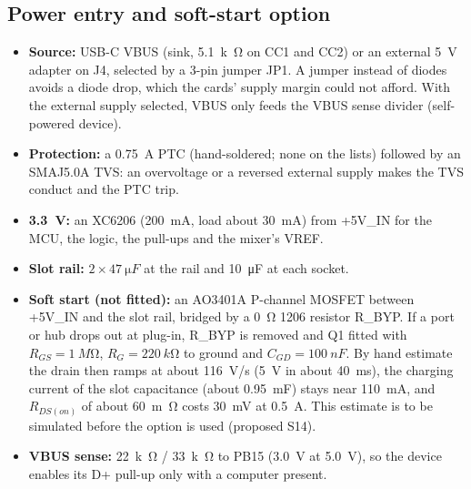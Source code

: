\documentclass[11pt,a4paper]{article}
\begin{document}
\subsection{Power entry and soft-start option}\label{sec:bppower}
\begin{itemize}
  \item \textbf{Source:} USB-C VBUS (sink, \SI{5.1}{k\ohm} on CC1 and CC2) or an external \SI{5}{V} adapter on J4,
    selected by a 3-pin jumper JP1. A jumper instead of diodes avoids a diode drop, which the cards' supply margin
    could not afford. With the external supply selected, VBUS only feeds the VBUS sense divider (self-powered device).
  \item \textbf{Protection:} a \SI{0.75}{A} PTC (hand-soldered; none on the lists) followed by an SMAJ5.0A TVS: an
    overvoltage or a reversed external supply makes the TVS conduct and the PTC trip.
  \item \textbf{\SI{3.3}{V}:} an XC6206 (\SI{200}{mA}, load about \SI{30}{mA}) from +5V\_IN for the MCU, the logic, the
    pull-ups and the mixer's VREF.
  \item \textbf{Slot rail:} $2\times\SI{47}{\micro F}$ at the rail and \SI{10}{\micro F} at each socket.
  \item \textbf{Soft start (not fitted):} an AO3401A P-channel MOSFET between +5V\_IN and the slot rail, bridged by a
    \SI{0}{\ohm} 1206 resistor R\_BYP. If a port or hub drops out at plug-in, R\_BYP is removed and Q1 fitted with
    $R_{GS} = \SI{1}{M\ohm}$, $R_G = \SI{220}{k\ohm}$ to ground and $C_{GD} = \SI{100}{nF}$. By hand estimate the drain
    then ramps at about \SI{116}{V/s} (\SI{5}{V} in about \SI{40}{ms}), the charging current of the slot capacitance
    (about \SI{0.95}{mF}) stays near \SI{110}{mA}, and $R_{DS(on)}$ of about \SI{60}{m\ohm} costs \SI{30}{mV} at
    \SI{0.5}{A}. This estimate is to be simulated before the option is used (proposed S14).
  \item \textbf{VBUS sense:} \SI{22}{k\ohm} / \SI{33}{k\ohm} to PB15 (\SI{3.0}{V} at \SI{5.0}{V}), so the device
    enables its D+ pull-up only with a computer present.
\end{itemize}
\end{document}
